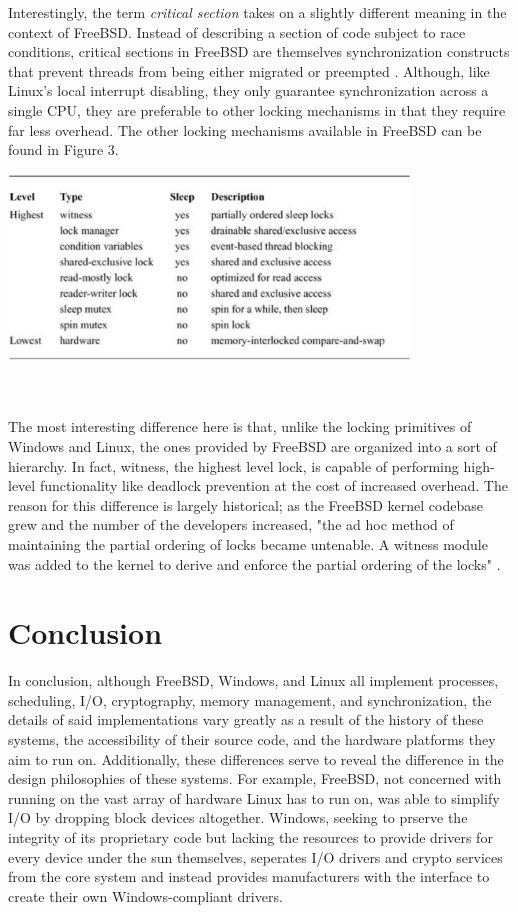 \documentclass[onecolumn, draftclsnofoot,10pt, compsoc]{IEEEtran}
\newlength{\drop}
\begin{document}
Interestingly, the term \textit{critical section} takes on a slightly different meaning in the context of FreeBSD. Instead of describing a section of code subject to race conditions, critical sections in FreeBSD are themselves synchronization constructs that prevent threads from being either migrated or preempted \cite{FreeBSD}. Although, like Linux's local interrupt disabling, they only guarantee synchronization across a single CPU, they are preferable to other locking mechanisms in that they require far less overhead. The other locking mechanisms available in FreeBSD can be found in Figure 3. 
\begin{minipage}{\linewidth}
\begin{center}
\includegraphics[width=0.8\textwidth]{table2.eps}
\end{center}
\end{minipage}
\\ \\ The most interesting difference here is that, unlike the locking primitives of Windows and Linux, the ones provided by FreeBSD are organized into a sort of hierarchy. In fact, witness, the highest level lock, is capable of performing high-level functionality like deadlock prevention at the cost of increased overhead. The reason for this difference is largely historical; as the FreeBSD kernel codebase grew and the number of the developers increased, "the ad hoc method of maintaining the partial ordering of locks became untenable. A witness module was added to the kernel to derive and enforce the partial ordering of the locks" \cite{FreeBSD}.
\section{Conclusion}
In conclusion, although FreeBSD, Windows, and Linux all implement processes, scheduling, I/O, cryptography, memory management, and synchronization, the details of said implementations vary greatly as a result of the history of these systems, the accessibility of their source code, and the hardware platforms they aim to run on. Additionally, these differences serve to reveal the difference in the design philosophies of these systems. For example, FreeBSD, not concerned with running on the vast array of hardware Linux has to run on, was able to simplify I/O by dropping block devices altogether. Windows, seeking to prserve the integrity of its proprietary code but lacking the resources to provide drivers for every device under the sun themselves, seperates I/O drivers and crypto services from the core system and instead provides manufacturers with the interface to create their own Windows-compliant drivers. 
\end{document}
